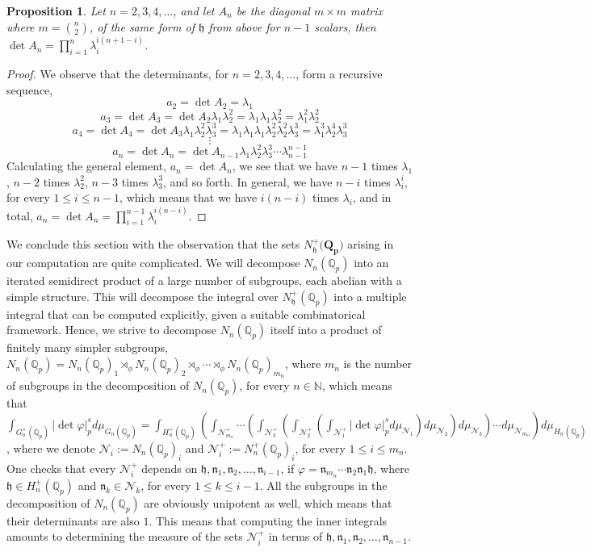 \documentclass[12pt]{article}
\newtheorem{proposition}[theorem]{Proposition}
\begin{document}
\begin{proposition}
\label{prop.h.matrix.determinant}
Let $n=2,3,4,\dots$, and let $A_n$ 
be the diagonal $m\times m$ matrix where $m=\binom{n}{2}$, of the same form of $\mathfrak{h}$ from above for $n-1$ scalars, then $\det A_n=\prod_{i=1}^{n}\lambda_i^{i(n+1-i)}$.
\end{proposition}
\begin{proof}
We observe that the determinants, for $n=2,3,4,\dots$, form a recursive sequence,
$$a_2=\det A_2=\lambda_1$$
$$a_3=\det A_3=\det A_2\lambda_1\lambda_2^2=\lambda_1\lambda_1\lambda_2^2=\lambda_1^2\lambda_2^2$$
$$a_4=\det A_4=\det A_3\lambda_1\lambda_2^2\lambda_3^3=\lambda_1\lambda_1\lambda_1\lambda_2^2\lambda_2^2\lambda_3^3=\lambda_1^3\lambda_2^4\lambda_3^3$$
$$\vdots$$
$$a_n=\det A_n=\det A_{n-1}\lambda_1\lambda_2^2\lambda_3^3\cdots\lambda_{n-1}^{n-1}$$
Calculating the general element, $a_n=\det A_n$, we see that we have $n-1$ times $\lambda_1$, $n-2$ times $\lambda_2^2$, $n-3$ times $\lambda_3^3$, and so forth. In general, we have $n-i$ times $\lambda_i^i$, for every $1\leq i\leq n-1$, which means that we have $i(n-i)$ times $\lambda_i$, and in total, $a_n=\det A_n=\prod_{i=1}^{n-1}\lambda_i^{i(n-i)}$.
\end{proof}
We conclude this section with the observation that the sets $N_{\mathfrak{h}}^+(\mathbf{{Q}_p)}$ arising in our computation are quite complicated. We will decompose $N_n(\mathbb{Q}_p)$ into an iterated semidirect product of a large number of subgroups, each abelian with a simple structure. This will decompose the integral over $N_{\mathfrak{h}}^+(\mathbb{Q}_p)$ into a multiple integral that can be computed explicitly, given a suitable combinatorical framework. Hence, we strive to decompose $N_n(\mathbb{Q}_p)$ itself into a product of finitely many simpler subgroups, $N_n(\mathbb{Q}_p)= N_n(\mathbb{Q}_p)_1\rtimes_{\phi} N_n(\mathbb{Q}_p)_2\rtimes_{\phi}\cdots\rtimes_{\phi} N_n(\mathbb{Q}_p)_{m_n}$, where $m_n$ is the number of subgroups in the decomposition of $N_n(\mathbb{Q}_p)$, for every $n\in\mathbb{N}$, which means that $\displaystyle\int_{G_n^+(\mathbb{Q}_p)}|\det\varphi|_p^sd\mu_{G_n(\mathbb{Q}_p)}=\displaystyle\int_{H_n^+(\mathbb{Q}_p)}\left(\displaystyle\int_{\mathcal{N}^+_{m_n}}\cdots\left(\displaystyle\int_{\mathcal{N}^+_3}\left(\displaystyle\int_{\mathcal{N}^+_2}\left(\displaystyle\int_{\mathcal{N}^+_1}|\det\varphi|_p^sd\mu_{\mathcal{N}_1}\right)d\mu_{\mathcal{N}_2}\right)d\mu_{\mathcal{N}_3}\right)\cdots d\mu_{\mathcal{N}_{m_n}}\right)d\mu_{H_n(\mathbb{Q}_p)}$, where we denote $\mathcal{N}_i:=N_n(\mathbb{Q}_p)_i$ and $\mathcal{N}^+_i:=N_n^+(\mathbb{Q}_p)_i$, for every $1\leq i\leq m_n$. One checks that every $\mathcal{N}^+_i$ depends on $\mathfrak{h},\mathfrak{n}_1,\mathfrak{n}_2,\dots,\mathfrak{n}_{i-1}$, if $\varphi=\mathfrak{n}_{m_n}\cdots\mathfrak{n}_2\mathfrak{n}_1\mathfrak{h}$, where $\mathfrak{h}\in H_n^+(\mathbb{Q}_p)$ and $\mathfrak{n}_k\in\mathcal{N}_{k}$, for every $1\leq k\leq i-1$. 
All the subgroups in the decomposition of $N_n(\mathbb{Q}_p)$ are obviously unipotent as well, which means that their determinants are also $1$. This means that computing the inner integrals amounts to determining the measure of the sets $\mathcal{N}^+_i$ in terms of $\mathfrak{h},\mathfrak{n}_1,\mathfrak{n}_2,\dots,\mathfrak{n}_{n-1}$.
\end{document}
